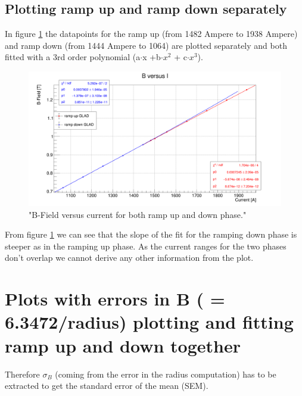 \documentclass[12pt, letterpaper]{article}
\begin{document}
\subsection{Plotting ramp up and ramp down separately}
In figure \ref{fig:ramp_up_down} the datapoints for the ramp up (from 1482 Ampere to 1938 Ampere) and ramp down (from 1444 Ampere to 1064) are plotted separately and both fitted with a 3rd order polynomial (a$\cdot$x +b$\cdot x^{2}$ + c$\cdot x^{3}$).
\begin{figure}[!htbp]
	\centering
	\includegraphics[width=.9\linewidth]{ramp_up_down.png}
	\caption{"B-Field versus current for both ramp up and down phase."}
	\label{fig:ramp_up_down}
\end{figure}

From figure \ref{fig:ramp_up_down} we can see that the slope of the fit for the ramping down phase is steeper as in the ramping up phase. As the current ranges for the two phases don't overlap we cannot derive any other information from the plot. 
\section{Plots with errors in B ( = 6.3472/radius) plotting and fitting ramp up and down together}
Therefore $\sigma_{B}$ (coming from the error in the radius computation) has to be extracted to get the standard error of the mean (SEM).\\
\end{document}
